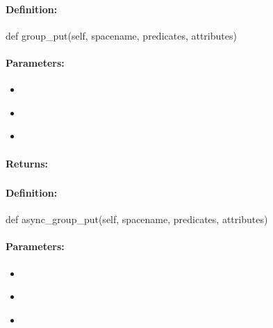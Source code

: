 \paragraph{Definition:}
\begin{pythoncode}
def group_put(self, spacename, predicates, attributes)
\end{pythoncode}

\paragraph{Parameters:}
\begin{itemize}[noitemsep]
\item {}\\

\item {}\\

\item {}\\

\end{itemize}

\paragraph{Returns:}


\pagebreak
\subsubsection{}
\label{api:python:async_group_put}


\paragraph{Definition:}
\begin{pythoncode}
def async_group_put(self, spacename, predicates, attributes)
\end{pythoncode}

\paragraph{Parameters:}
\begin{itemize}[noitemsep]
\item {}\\

\item {}\\

\item {}\\

\end{itemize}

